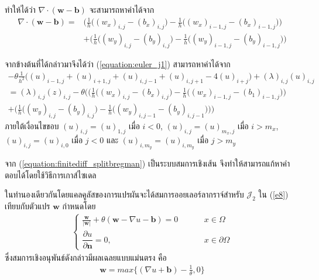 ทำให้ได้ว่า $\nabla \cdot (\boldsymbol{w}-\boldsymbol{b})$ จะสามารถหาค่าได้จาก
\begin{align}
	\nonumber \nabla \cdot (\boldsymbol{w}-\boldsymbol{b}) = &\bigg( \frac{1}{h} \Big((w_x)_{i,j}-(b_x)_{i,j}\Big) - \frac{1}{h} \Big((w_x)_{i-1,j}-(b_x)_{i-1,j}\Big) \bigg) \\ 
	&+ \bigg( \frac{1}{h} \Big((w_y)_{i,j}-(b_y)_{i,j}\Big) - \frac{1}{h} \Big((w_y)_{i-1,j}-(b_y)_{i-1,j}\Big) \bigg)
\end{align}

จากข้างต้นที่ได้กล่าวมาจึงได้ว่า (\ref{equation:euler_j1})  สามารถหาค่าได้จาก 
\begin{align}
	\nonumber - \theta \frac{1}{h^2}\Big( (u)_{i-1,j} + (u)_{i+1,j} + (u)_{i,j-1} + (u)_{i,j+1} - 4(u)_{i+j} \Big) + (\lambda)_{i,j} (u)_{i,j} \\ \nonumber = (\lambda)_{i,j} (z)_{i,j} - \theta \Bigg( \bigg( \frac{1}{h} \Big((w_x)_{i,j}-(b_x)_{i,j}\Big) - \frac{1}{h} \Big((w_x)_{i-1,j}-(b_1)_{i-1,j}\Big) \bigg) \\ + \bigg( \frac{1}{h} \Big((w_y)_{i,j}-(b_y)_{i,j} \Big) - \frac{1}{h} \Big((w_y)_{i,j-1}-(b_y)_{i,j-1} \Big) \bigg) \Bigg)
	\label{equation:finitediff_splitbregman}
\end{align}
ภายใต้เงื่อนไขขอบ $(u)_{i,j} = (u)_{1,j}$ เมื่อ $i < 0$, $(u)_{i,j} = (u)_{m_x,j}$ เมื่อ $i > m_x$, $(u)_{i,j} = (u)_{i,0}$ เมื่อ $j < 0$ และ $(u)_{i,m_y} = (u)_{i,m_y}$ เมื่อ $j > m_y$ 

\hspace{1cm} จาก (\ref{equation:finitediff_splitbregman}) เป็นระบบสมการเชิงเส้น จึงทำให้สามารถแก้หาคำตอบได้โดยใช้วิธีการเกาส์ไซเดล


\hspace{1cm} ในทำนองเดียวกันโดยแคลคูลัสของการแปรผันจะได้สมการออยเลอร์ลากราจ์สำหรับ $\mathcal{J}_2$ ใน (\ref{e8}) เทียบกับตัวแปร $\boldsymbol{w}$ กำหนดโดย
\begin{align}
	\left \{ \begin{array}{ll} 	\frac{\boldsymbol{w}}{|\boldsymbol{w}|} + \theta(\boldsymbol{w}-\nabla u-\boldsymbol{b}) = 0   & \hspace{1cm} x \in \Omega \\
	\dfrac{\partial u}{\partial \boldsymbol{n}} = 0, & \hspace{1cm} x \in \partial \Omega \end{array} \right .
\end{align}
ซึ่งสมการเชิงอนุพันธ์ดังกล่าวมีผลเฉลยแบบแม่นตรง \cite{ref:splitbergman-inpaint} คือ 
\begin{align}
	\boldsymbol{w} = max\bigg\{(\nabla u + \boldsymbol{b}) - \frac{1}{\theta},0\bigg\}
	\label{equation:euler_w_exact}
\end{align}

